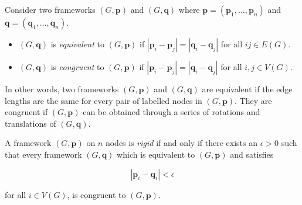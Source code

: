 \begin{definition}
Consider two frameworks $(G,\mathbf{p})$ and $(G,\mathbf{q})$ where $\mathbf{p} = (\mathbf{p}_1, \hdots, \mathbf{p}_n)$ and $\mathbf{q} = (\mathbf{q}_1, \hdots, \mathbf{q}_n)$.
\begin{itemize}
    \item $(G,\mathbf{q})$ is \textit{equivalent} to $(G,\mathbf{p})$ if $|\mathbf{p}_i - \mathbf{p}_j| = |\mathbf{q}_i - \mathbf{q}_j|$ for all $ij \in E(G)$.
    \vspace{-3mm}
    \item $(G,\mathbf{q})$ is \textit{congruent} to $(G,\mathbf{p})$ if $|\mathbf{p}_i - \mathbf{p}_j| = |\mathbf{q}_i - \mathbf{q}_j|$ for all $i, j \in V(G)$.
\end{itemize}
\end{definition}

\begin{flushleft}
In other words, two frameworks $(G,\mathbf{p})$ and $(G,\mathbf{q})$ are equivalent if the edge lengths are the same for every pair of labelled nodes in $(G,\mathbf{p})$. They are congruent if $(G,\mathbf{p})$ can be obtained through a series of rotations and translations of $(G,\mathbf{q})$. 
\end{flushleft}

\begin{theorem}
\cite{asimow} A framework $(G,\mathbf{p})$ on $n$ nodes is \textit{rigid} if and only if there exists an $\epsilon > 0$ such that every framework $(G,\textbf{q})$ which is equivalent to $(G,\mathbf{p})$ and satisfies 

\[
|\mathbf{p}_i - \mathbf{q}_i| < \epsilon
\]
\begin{flushleft}
for all $i \in V(G)$, is congruent to $(G,\mathbf{p})$.  
\end{flushleft}
\end{theorem}

